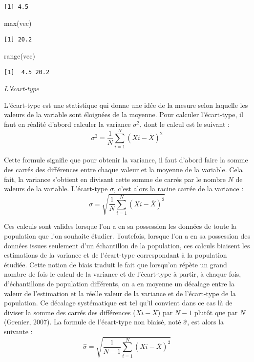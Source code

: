 \documentclass[
  letterpaper,
]{book}
\newenvironment{Shaded}{\begin{snugshade}}{\end{snugshade}}
\newcommand{\FunctionTok}[1]{\textcolor[rgb]{0.28,0.35,0.67}{#1}}
\newcommand{\NormalTok}[1]{\textcolor[rgb]{0.00,0.23,0.31}{#1}}
\begin{document}
\begin{verbatim}
[1] 4.5
\end{verbatim}

\begin{Shaded}
\begin{Highlighting}[]
\FunctionTok{max}\NormalTok{(vec)}
\end{Highlighting}
\end{Shaded}

\begin{verbatim}
[1] 20.2
\end{verbatim}

\begin{Shaded}
\begin{Highlighting}[]
\FunctionTok{range}\NormalTok{(vec)}
\end{Highlighting}
\end{Shaded}

\begin{verbatim}
[1]  4.5 20.2
\end{verbatim}

\emph{L'écart-type}

L'écart-type est une statistique qui donne une idée de la mesure selon
laquelle les valeurs de la variable sont éloignées de la moyenne. Pour
calculer l'écart-type, il faut en réalité d'abord calculer la variance
\(\sigma^2\), dont le calcul est le suivant :
\[\sigma^2 = \frac{1}{N}\sum_{i=1}^{N} (X{i} - \overline{X})^2\]

Cette formule signifie que pour obtenir la variance, il faut d'abord
faire la somme des carrés des différences entre chaque valeur et la
moyenne de la variable. Cela fait, la variance s'obtient en divisant
cette somme de carrés par le nombre \(N\) de valeurs de la variable.
L'écart-type \(\sigma\), c'est alors la racine carrée de la variance :
\[\sigma = \sqrt{\frac{1}{N}\sum_{i=1}^{N} (X{i} - \overline{X})^2}\]

Ces calculs sont valides lorsque l'on a en sa possession les données de
toute la population que l'on souhaite étudier. Toutefois, lorsque l'on a
en sa possession des données issues seulement d'un échantillon de la
population, ces calculs biaisent les estimations de la variance et de
l'écart-type correspondant à la population étudiée. Cette notion de
biais traduit le fait que lorsqu'on répète un grand nombre de fois le
calcul de la variance et de l'écart-type à partir, à chaque fois,
d'échantillons de population différents, on a en moyenne un décalage
entre la valeur de l'estimation et la réelle valeur de la variance et de
l'écart-type de la population. Ce décalage systématique est tel qu'il
convient dans ce cas là de diviser la somme des carrés des différences
(\(X{i} - \overline{X}\)) par \(N-1\) plutôt que par \(N\) (Grenier,
2007). La formule de l'écart-type non biaisé, noté
\emph{\(\hat{\sigma}\)}, est alors la suivante :
\[\hat{\sigma} = \sqrt{\frac{1}{N-1}\sum_{i=1}^{N} (X{i} - \overline{X})^2}\]
\end{document}
